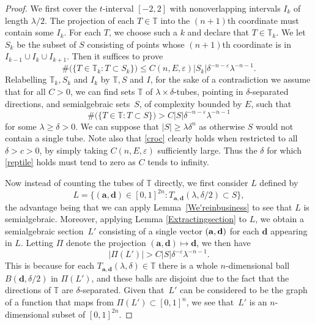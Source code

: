 \documentclass[letterpaper, reqno, 11pt]{amsart}
\theoremstyle{remark}
\numberwithin{equation}{section}
\begin{document}
\begin{proof}  We first cover the $t$-interval $[-2,2]$ with nonoverlapping intervals $I_k$ of length $\lambda/2$. The projection of each $T \in \mathbb{T}$ into the $(n+1)$th coordinate must contain some $I_k$. For each $T$, we choose such a $k$ and declare that $T \in \mathbb{T}_k$. We let 
$S_k$ be the subset of $S$ consisting of points whose $(n+1)$th coordinate is in $I_{k-1}\cup I_k\cup I_{k+1}$. Then it suffices to prove
\begin{equation*}\#\big(\big\{ T \in \mathbb{T}_k : T \subset S_k \big\}\big) \leq C(n,E,\varepsilon) |S_k| \delta^{-n-\varepsilon} \lambda^{-n-1}.\end{equation*}
Relabelling $\mathbb{T}_k, S_k$ and $I_k$ by $\mathbb{T}, S$ and $I$,  for the sake of a contradiction we assume that for all $C>0$, we can find sets $\mathbb{T}$ of $\lambda\times\delta$-tubes, pointing in  $\delta$-separated directions, and semialgebraic sets~$S$, of complexity bounded by $E$, such that
\begin{equation}\label{reptile}\#\big(\big\{ T \in \mathbb{T} :  T\subset S \big\}\big) > C|S| \delta^{-n-\varepsilon}\lambda^{-n-1}\end{equation}
for some $\lambda\ge \delta>0$. We can suppose that $|S|\ge \lambda\delta^{n}$ as otherwise $S$ would not contain a single tube. Note also that \eqref{croc} clearly holds when restricted to all $\delta>c>0$, by simply taking $C(n,E,\varepsilon)$ sufficiently large. Thus the $\delta$ for which \eqref{reptile} holds must tend to zero as $C$ tends to infinity. 

Now instead of counting the tubes of $\mathbb{T}$ directly, we first consider $L$ defined by $$L = \big\{ (\mathbf{a},\mathbf{d})\in[0,1]^{2n}: T_{\mathbf{a},\mathbf{d}}(\lambda, \delta/2) \subset S \big\},$$  the advantage being that we can apply Lemma~\ref{We'reinbusiness} to see that $L$ is  semialgebraic. Moreover, applying Lemma \ref{Extractingsection} to $L$, we obtain a semialgebraic section~$L'$ consisting of a single vector $(\bf{a},\bf{d})$ for each $\mathbf{d}$ appearing in  $L$.
Letting $\Pi$ denote the projection $(\mathbf{a},\mathbf{d})\mapsto \mathbf{d}$, we then have 
$$|\Pi(L')| > C|S| \delta^{-\varepsilon}\lambda^{-n-1}.$$
This is because for each $T_{\mathbf{a},\mathbf{d}}(\lambda, \delta)\in\mathbb{T}$ there is a whole $n$-dimensional ball $B(\mathbf{d},\delta/2)$ in $\Pi(L')$, and these balls are disjoint due to the fact that the directions of $\mathbb{T}$ are $\delta$-separated. 
Given that~$L'$ can be considered to be the graph of a function that maps from $\Pi(L')\subset [0,1]^n$, we see that~$L'$ is an $n$-dimensional subset of $[0,1]^{2n}$.


\end{proof}
\end{document}
